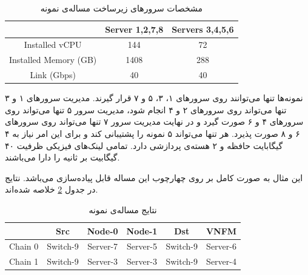 \begin{table}[h!]
    \caption{مشخصات سرورهای زیرساخت مساله‌ی نمونه}
    \vspace{0.5cm}
    \begin{center}\begin{latin}\begin{tabular}{|c|c|c|}
        \hline
        & Server 1,2,7,8 & Servers 3,4,5,6 \\
        \hline
        Installed vCPU & 144 & 72 \\
        \hline
        Installed Memory (GB) & 1408 & 288 \\
        \hline
        Link (Gbps) & 40 & 40 \\
        \hline
    \end{tabular}\end{latin}\end{center}
    \label{fig.17}
\end{table}

نمونه‌ها تنها می‌توانند روی سرورهای ۱، ۳، ۵ و ۷ قرار گیرند.
مدیریت سرورهای ۱ و ۳ تنها می‌تواند روی سرورهای ۲ و ۴ انجام شود،
مدیریت سرور ۵ تنها می‌تواند روی سرورهای ۴ و ۶ صورت گیرد
و در نهایت مدیریت سرور ۷ تنها می‌تواند روی سرورهای ۶ و ۸ صورت پذیرد.
هر  تنها می‌تواند ۵ نمونه را پشتیبانی کند و
برای این امر نیاز به ۴ گیگابایت حافظه و ۲ هسته‌ی پردازشی دارد.
تمامی لینک‌های فیزیکی ظرفیت ۴۰ گیگابیت بر ثانیه را دارا می‌باشند.

این مثال به صورت کامل بر روی چهارچوب این مساله قابل پیاده‌سازی می‌باشد.
نتایج در جدول \ref{table.2} خلاصه شده‌اند.


\begin{table}[h!]
    \caption{نتایج مساله‌ی نمونه}
    \vspace{0.5cm}
    \begin{center}\begin{latin}\begin{tabular}{|c|c|c|c|c|c|}
        \hline
        & Src & Node-0 & Node-1 & Dst & VNFM \\
        \hline
        Chain 0 & Switch-9 & Server-7 & Server-5 & Switch-9 & Server-6 \\
        \hline
        Chain 1 & Switch-9 & Server-3 & Server-3 & Switch-9 & Server-4 \\
        \hline
    \end{tabular}\end{latin}\end{center}
    \label{table.2}
\end{table}


